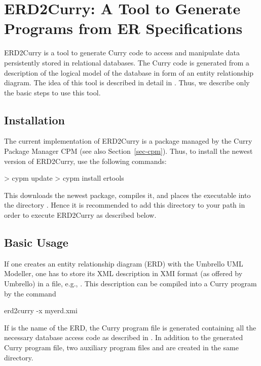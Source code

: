 \section{ERD2Curry: A Tool to Generate Programs from ER Specifications}
\label{sec-erd2curry}

ERD2Curry
is a tool to generate Curry code to access and manipulate data
persistently stored in relational databases.
The Curry code is generated from a description of the logical model
of the database in form of an
entity relationship diagram.
The idea of this tool is described in detail in
\cite{BrasselHanusMueller08PADL}.
Thus, we describe only the basic steps to use this tool.

\subsection{Installation}

The current implementation of ERD2Curry is a package
managed by the Curry Package Manager CPM
(see also Section~\ref{sec-cpm}).
Thus, to install the newest version of ERD2Curry, use the following commands:
%
\begin{curry}
> cypm update
> cypm install ertools
\end{curry}
%
This downloads the newest package, compiles it, and places
the executable  into the directory .
Hence it is recommended to add this directory to your path
in order to execute ERD2Curry as described below.

\subsection{Basic Usage}

If one creates an entity relationship diagram (ERD)
with the Umbrello UML Modeller, one has to store its
XML description in XMI format (as offered by Umbrello)
in a file, e.g., .
This description can be compiled into a Curry program by the
command
\begin{curry}
erd2curry -x myerd.xmi
\end{curry}
If  is the name of the ERD, the Curry program file
 is generated containing all the necessary
database access code as described in \cite{BrasselHanusMueller08PADL}.
In addition to the generated Curry program file,
two auxiliary program files
 and 
are created in the same directory.

